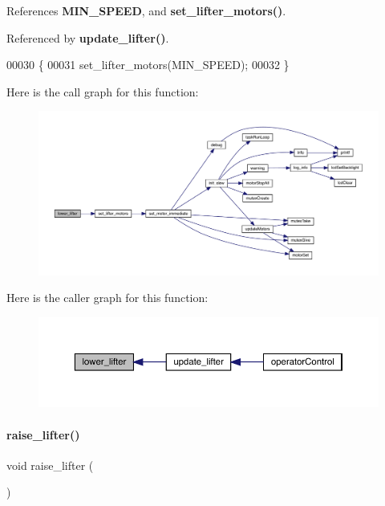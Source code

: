 References \textbf{ M\+I\+N\+\_\+\+S\+P\+E\+ED}, and \textbf{ set\+\_\+lifter\+\_\+motors()}.



Referenced by \textbf{ update\+\_\+lifter()}.


\begin{DoxyCode}
00030                    \{
00031   set_lifter_motors(MIN_SPEED);
00032 \}
\end{DoxyCode}
Here is the call graph for this function\+:\nopagebreak
\begin{figure}[H]
\begin{center}
\leavevmode
\includegraphics[width=350pt]{lifter_8c_aa7d2d04059f57cc5b8582f6fd0726dc1_cgraph}
\end{center}
\end{figure}
Here is the caller graph for this function\+:\nopagebreak
\begin{figure}[H]
\begin{center}
\leavevmode
\includegraphics[width=350pt]{lifter_8c_aa7d2d04059f57cc5b8582f6fd0726dc1_icgraph}
\end{center}
\end{figure}
\mbox{\label{lifter_8c_a7452163ed7946b6262f41de51c62dfd4}} 
\paragraph{raise\+\_\+lifter()}
{\footnotesize\ttfamily void raise\+\_\+lifter (\begin{DoxyParamCaption}{ }\end{DoxyParamCaption})}




